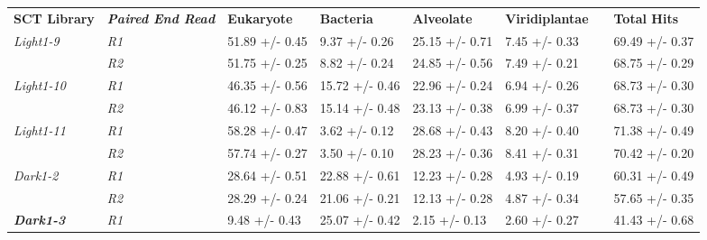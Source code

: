 \begin{table}[h]
     \begin{tabular}{|l|l|l|l|l|l|l|l|}
         \cmidrule(r){1-6} \cmidrule(l){8-8}
         \textbf{SCT Library} & \textit{\textbf{Paired End Read}}          & \textbf{Eukaryote} & \textbf{Bacteria} & \textbf{Alveolate} & \textbf{Viridiplantae} &  & \textbf{Total Hits} \\ \cmidrule(r){1-6} \cmidrule(l){8-8} 
         \textit{Light1-9}    & \textit{R1}                   & 51.89 +/- 0.45     & 9.37 +/- 0.26     & 25.15 +/-  0.71    & 7.45 +/- 0.33          &  & 69.49 +/- 0.37      \\ \cmidrule(lr){2-2}
                              & \textit{R2}                   & 51.75 +/- 0.25     & 8.82 +/- 0.24     & 24.85 +/- 0.56     & 7.49 +/- 0.21          &  & 68.75 +/- 0.29      \\ \cmidrule(r){1-6} \cmidrule(l){8-8} 
         \textit{Light1-10}   & \textit{R1}                   & 46.35 +/- 0.56     & 15.72 +/- 0.46    & 22.96 +/- 0.24     & 6.94 +/- 0.26          &  & 68.73 +/- 0.30      \\ \cmidrule(lr){2-2}
                              & \textit{R2}                   & 46.12 +/- 0.83     & 15.14 +/- 0.48    & 23.13 +/- 0.38     & 6.99 +/- 0.37          &  & 68.73 +/- 0.30      \\ \cmidrule(r){1-6} \cmidrule(l){8-8} 
         \textit{Light1-11}   & \textit{R1}                   & 58.28 +/- 0.47     & 3.62 +/- 0.12     & 28.68 +/- 0.43     & 8.20 +/- 0.40          &  & 71.38 +/- 0.49      \\ \cmidrule(lr){2-2}
                              & \textit{R2}                   & 57.74 +/- 0.27     & 3.50 +/- 0.10     & 28.23 +/- 0.36     & 8.41 +/- 0.31          &  & 70.42 +/- 0.20      \\ \cmidrule(r){1-6} \cmidrule(l){8-8} 
         \textit{Dark1-2}     & \textit{R1}                   & 28.64 +/- 0.51     & 22.88 +/- 0.61    & 12.23 +/- 0.28     & 4.93 +/- 0.19          &  & 60.31 +/- 0.49      \\ \cmidrule(lr){2-2}
                              & \textit{R2}                   & 28.29 +/- 0.24     & 21.06 +/- 0.21    & 12.13 +/- 0.28     & 4.87 +/- 0.34          &  & 57.65 +/- 0.35      \\ \cmidrule(r){1-6} \cmidrule(l){8-8} 
         \textbf{\textit{Dark1-3}}     & \textit{R1}          & 9.48 +/- 0.43      & 25.07 +/- 0.42    & 2.15 +/- 0.13      & 2.60 +/- 0.27          &  & 41.43 +/- 0.68      \\ \cmidrule(lr){2-2}

\end{tabular}
\end{table}
